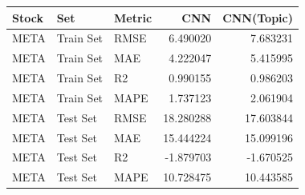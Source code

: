 \begin{tabular}{lllrr}
\toprule
Stock & Set & Metric & CNN & CNN(Topic) \\
\midrule
META & Train Set & RMSE & 6.490020 & 7.683231 \\
META & Train Set & MAE & 4.222047 & 5.415995 \\
META & Train Set & R2 & 0.990155 & 0.986203 \\
META & Train Set & MAPE & 1.737123 & 2.061904 \\
META & Test Set & RMSE & 18.280288 & 17.603844 \\
META & Test Set & MAE & 15.444224 & 15.099196 \\
META & Test Set & R2 & -1.879703 & -1.670525 \\
META & Test Set & MAPE & 10.728475 & 10.443585 \\
\bottomrule
\end{tabular}
